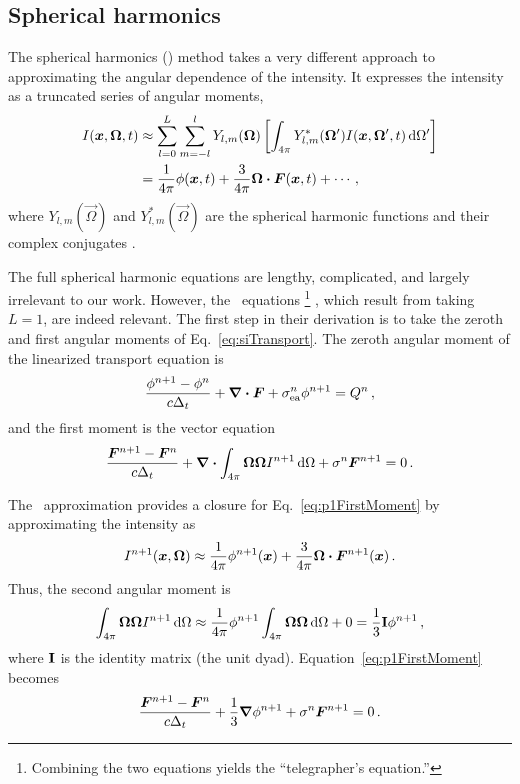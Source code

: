 \subsection{Spherical harmonics}\label{sec:bgPn}
The spherical harmonics (\PN) method takes a very different approach to
approximating the angular dependence of the intensity. It expresses the
intensity as a truncated series of angular moments,
\begin{align*}
  I(\bm{x},\bm{\Omega},t)
  &\approx \sum_{l=0}^{L} \sum_{m=-l}^{l} Y_{l,m}(\bm{\Omega}) \left[
  \int_{4\pi} Y_{l,m}^\ast(\bm{\Omega}') I(\bm{x},\bm{\Omega}',t) \mathop{}\!\mathrm{d} \Omega'
  \right]
  \\
  &= \frac{1}{4\pi} \phi(\bm{x}, t) + \frac{3}{4\pi} \bm{\Omega}\bm{\cdot}
  \bm{F}(\bm{x},t) + \cdots\,,
\end{align*}
where $Y_{l,m}(\vec{\Omega})$ and $Y_{l,m}^*(\vec{\Omega})$ are the spherical
harmonic functions and their complex conjugates \cite{McC2008a,Lar2007}.

The full spherical harmonic equations \cite{McC2007} are lengthy, complicated, and
largely irrelevant to our work. However, the \Pone\ equations%
\footnote{Combining the two equations yields the ``telegrapher's equation.''}%
, which result from
taking $L=1$, are indeed relevant. The first step in their derivation is to take the
zeroth and first angular moments of Eq.~\eqref{eq:siTransport}. The zeroth
angular moment of the linearized transport equation is
\begin{equation}\label{eq:p1ZerothMoment}
  \frac{\phi^{n+1} - \phi^n }{c \Delta_t}
  + \bm{\nabla} \bm{\cdot} \bm{F}
  + \sigma_\mathrm{ea}^n \phi^{n+1}
  = Q^n\,,
\end{equation}
and the first moment is the vector equation
\begin{equation}\label{eq:p1FirstMoment}
  \frac{\bm{F}^{n+1} - \bm{F}^n }{c \Delta_t} + \bm{\nabla} \bm{\cdot} \int_{4\pi}
  \bm{\Omega}\bm{\Omega} I^{n+1} \mathop{}\!\mathrm{d}\Omega
  + \sigma^n \bm{F}^{n+1}
  = 0\,.
\end{equation}

The \Pone\ approximation provides a closure for Eq.~\eqref{eq:p1FirstMoment} by
approximating the intensity as
\begin{equation}\label{eq:p1Approx}
  I^{n+1}(\bm{x},\bm{\Omega})
  \approx \frac{1}{4\pi} \phi^{n+1}(\bm{x})
  + \frac{3}{4\pi} \bm{\Omega}\bm{\cdot} \bm{F}^{n+1}(\bm{x}) \,.
\end{equation}
Thus, the second angular moment is
\begin{equation*}
  \int_{4\pi} \bm{\Omega}\bm{\Omega} I^{n+1} \mathop{}\!\mathrm{d}\Omega
  \approx \frac{1}{4\pi} \phi^{n+1}
  \int_{4\pi} \bm{\Omega}\bm{\Omega}\mathop{}\!\mathrm{d}\Omega + 0
  = \frac{1}{3} \mathbf{I} \phi^{n+1}\,,
\end{equation*}
where $\mathbf{I}$ is the identity matrix (the unit dyad).
Equation~\eqref{eq:p1FirstMoment} becomes
\begin{equation} \label{eq:p1FirstMoment2}
  \frac{\bm{F}^{n+1} - \bm{F}^n }{c \Delta_t} + \frac{1}{3} \bm{\nabla} \phi^{n+1}
  + \sigma^n \bm{F}^{n+1}
  = 0\,.
\end{equation}


